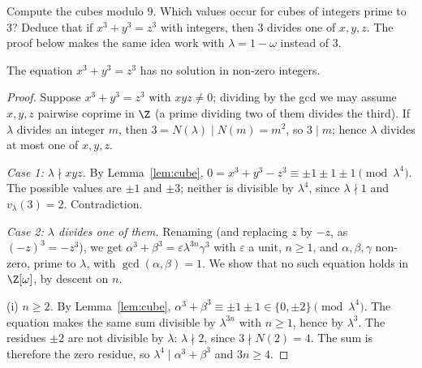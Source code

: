 \begin{think}
Compute the cubes modulo $9$. Which values occur for cubes of integers prime to $3$? Deduce that if $x^3+y^3=z^3$ with integers, then $3$ divides one of $x,y,z$. The proof below makes the same idea work with $\lambda=1-\omega$ instead of $3$.
\end{think}

\begin{theorem}\label{thm:flt3}
The equation $x^3+y^3=z^3$ has no solution in non-zero integers.
\end{theorem}
\begin{proof}
Suppose $x^3+y^3=z^3$ with $xyz\ne0$; dividing by the gcd we may assume $x,y,z$ pairwise coprime in $\Z$ (a prime dividing two of them divides the third). If $\lambda$ divides an integer $m$, then $3=N(\lambda)\mid N(m)=m^2$, so $3\mid m$; hence $\lambda$ divides at most one of $x,y,z$.

\emph{Case 1: $\lambda\nmid xyz$.} By Lemma~\ref{lem:cube}, $0=x^3+y^3-z^3\equiv\pm1\pm1\pm1\pmod{\lambda^4}$. The possible values are $\pm1$ and $\pm3$; neither is divisible by $\lambda^4$, since $\lambda\nmid1$ and $v_\lambda(3)=2$. Contradiction.

\emph{Case 2: $\lambda$ divides one of them.} Renaming (and replacing $z$ by $-z$, as $(-z)^3=-z^3$), we get $\alpha^3+\beta^3=\varepsilon\lambda^{3n}\gamma^3$ with $\varepsilon$ a unit, $n\ge1$, and $\alpha,\beta,\gamma$ non-zero, prime to $\lambda$, with $\gcd(\alpha,\beta)=1$. We show that no such equation holds in $\Z[\omega]$, by descent on $n$.

(i) \emph{$n\ge2$.} By Lemma~\ref{lem:cube}, $\alpha^3+\beta^3\equiv\pm1\pm1\in\{0,\pm2\}\pmod{\lambda^4}$. The equation makes the same sum divisible by $\lambda^{3n}$ with $n\ge1$, hence by $\lambda^3$. The residues $\pm2$ are not divisible by $\lambda$: $\lambda\nmid2$, since $3\nmid N(2)=4$. The sum is therefore the zero residue, so $\lambda^4\mid\alpha^3+\beta^3$ and $3n\ge4$.


\end{proof}
